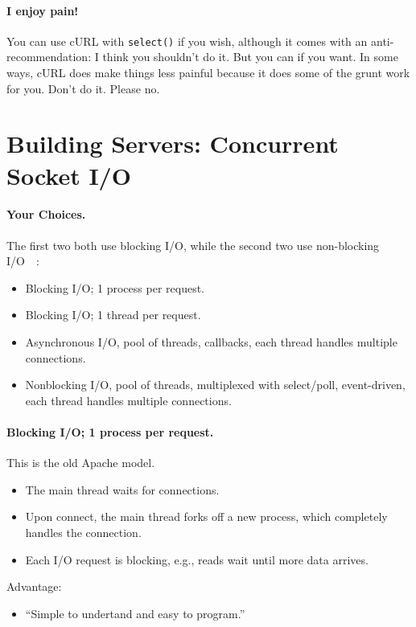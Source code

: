 \documentclass[a4paper]{report}
\begin{document}
\paragraph{I enjoy pain!} You can use cURL with \texttt{select()} if you wish, although it comes with an anti-recommendation: I think you shouldn't do it. But you can if you want. In some ways, cURL does make things less painful because it does some of the grunt work for you. Don't do it. Please no.

\section*{Building Servers: Concurrent Socket I/O}

\paragraph{Your Choices.} The first two both use blocking I/O, while the second two use
non-blocking I/O~~\cite{gplus:concurrent}:
    \begin{itemize}
      \item Blocking I/O; 1 process per request.
      \item Blocking I/O; 1 thread per request.
      \item Asynchronous I/O, pool of threads, callbacks, each thread handles multiple connections.
      \item Nonblocking I/O, pool of threads, multiplexed with select/poll,
        event-driven, each thread handles multiple connections.
    \end{itemize}

\paragraph{Blocking I/O; 1 process per request.}
This is the old Apache model.
  \begin{itemize}
    \item The main thread waits for connections.
    \item Upon connect, the main thread forks off a new process, which completely
      handles the connection.
    \item Each I/O request is blocking, e.g., reads wait until more data arrives.
  \end{itemize}

Advantage: 
  \begin{itemize}
    \item ``Simple to undertand and easy to program.''
  \end{itemize}
\end{document}
